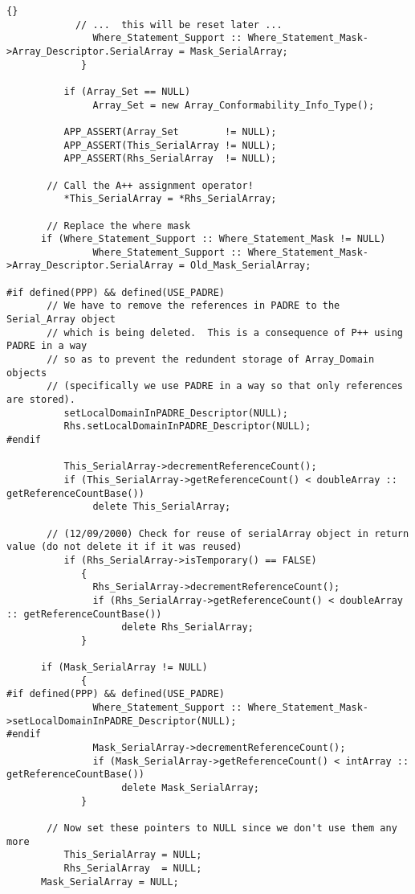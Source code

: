 \documentclass[10pt]{llncs}
\begin{document}
\begin{lstlisting}{}
            // ...  this will be reset later ...
               Where_Statement_Support :: Where_Statement_Mask->Array_Descriptor.SerialArray = Mask_SerialArray; 
             }

          if (Array_Set == NULL)
               Array_Set = new Array_Conformability_Info_Type();

          APP_ASSERT(Array_Set        != NULL);
          APP_ASSERT(This_SerialArray != NULL);
          APP_ASSERT(Rhs_SerialArray  != NULL);

       // Call the A++ assignment operator!
          *This_SerialArray = *Rhs_SerialArray;

       // Replace the where mask
	  if (Where_Statement_Support :: Where_Statement_Mask != NULL)
               Where_Statement_Support :: Where_Statement_Mask->Array_Descriptor.SerialArray = Old_Mask_SerialArray;

#if defined(PPP) && defined(USE_PADRE)
       // We have to remove the references in PADRE to the Serial_Array object
       // which is being deleted.  This is a consequence of P++ using PADRE in a way
       // so as to prevent the redundent storage of Array_Domain objects
       // (specifically we use PADRE in a way so that only references are stored).
          setLocalDomainInPADRE_Descriptor(NULL);
          Rhs.setLocalDomainInPADRE_Descriptor(NULL);
#endif

          This_SerialArray->decrementReferenceCount();
          if (This_SerialArray->getReferenceCount() < doubleArray :: getReferenceCountBase())
               delete This_SerialArray;

       // (12/09/2000) Check for reuse of serialArray object in return value (do not delete it if it was reused)
          if (Rhs_SerialArray->isTemporary() == FALSE)
             {
               Rhs_SerialArray->decrementReferenceCount();
               if (Rhs_SerialArray->getReferenceCount() < doubleArray :: getReferenceCountBase())
                    delete Rhs_SerialArray;
             }

	  if (Mask_SerialArray != NULL) 
             {
#if defined(PPP) && defined(USE_PADRE)
               Where_Statement_Support :: Where_Statement_Mask->setLocalDomainInPADRE_Descriptor(NULL);
#endif
               Mask_SerialArray->decrementReferenceCount();
               if (Mask_SerialArray->getReferenceCount() < intArray :: getReferenceCountBase())
                    delete Mask_SerialArray;
             }

       // Now set these pointers to NULL since we don't use them any more
          This_SerialArray = NULL;
          Rhs_SerialArray  = NULL;
	  Mask_SerialArray = NULL;


\end{lstlisting}
\end{document}
